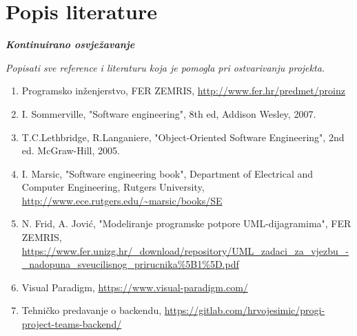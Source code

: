 \chapter*{Popis literature}
	 	
 		\textbf{\textit{Kontinuirano osvježavanje}}
	
		\textit{Popisati sve reference i literaturu koja je pomogla pri ostvarivanju projekta.}
		
		
		\begin{enumerate}
			
			
			\item  Programsko inženjerstvo, FER ZEMRIS, \url{http://www.fer.hr/predmet/proinz}
			
			\item  I. Sommerville, "Software engineering", 8th ed, Addison Wesley, 2007.
			
			\item  T.C.Lethbridge, R.Langaniere, "Object-Oriented Software Engineering", 2nd ed. McGraw-Hill, 2005.
			
			\item  I. Marsic, "Software engineering book", Department of Electrical and Computer Engineering, Rutgers University, \url{http://www.ece.rutgers.edu/~marsic/books/SE}

			\item  N. Frid, A. Jović, "Modeliranje programske potpore UML-dijagramima", FER ZEMRIS, \url{https://www.fer.unizg.hr/_download/repository/UML_zadaci_za_vjezbu_-_nadopuna_sveucilisnog_prirucnika%5B1%5D.pdf}

			\item  Visual Paradigm, \url{https://www.visual-paradigm.com/}
			
			\item  Tehničko predavanje o backendu, \url{https://gitlab.com/hrvojesimic/progi-project-teams-backend/}

		\end{enumerate}
		
		 